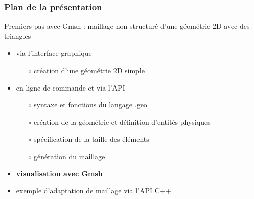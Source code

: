 \documentclass[aspectratio=169]{beamer}
\begin{document}
\begin{frame}[fragile]
\frametitle{Plan de la présentation}
Premiers pas avec Gmsh : maillage non-structuré d'une géométrie 2D avec des triangles
\begin{itemize}
  \item via l'interface graphique
  \begin{itemize}
    \item[$\circ$] création d'une géométrie 2D simple
  \end{itemize}
  \item en ligne de commande et via l'API
  \begin{itemize}
    \item[$\circ$] syntaxe et fonctions du langage .geo
    \item[$\circ$] création de la géométrie et définition d'entités physiques
    \item[$\circ$] spécification de la taille des éléments
    \item[$\circ$] génération du maillage
  \end{itemize}
  \item \textbf{visualisation avec Gmsh}
  \item exemple d'adaptation de maillage via l'API C++
\end{itemize}
\end{frame}
\end{document}
